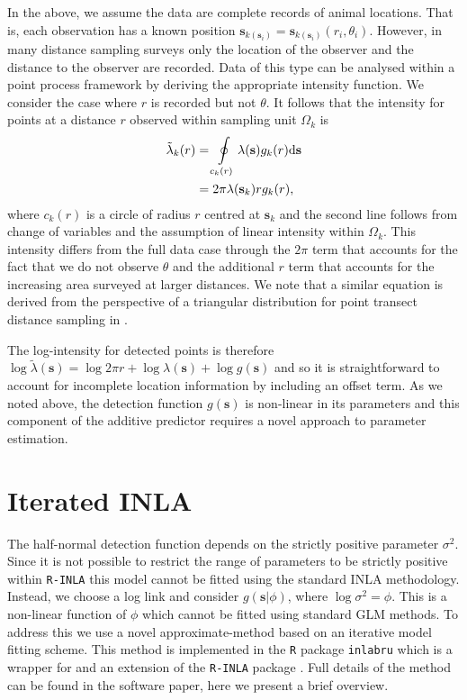 \documentclass{statsoc}
\newcommand{\bs}{\mathbf{s}}
\newcommand{\tl}{\tilde{\lambda}}   %
\begin{document}
In the above, we assume the data are complete records of animal locations.  That is, each observation has a known position $\bs_{k(\bs_i)} = \bs_{k(\bs_i)}(r_i, \theta_i)$.  However, in many distance sampling surveys only the location of the observer and the distance to the observer are recorded.  Data of this type can be analysed within a point process framework by deriving the appropriate intensity function.  We consider the case where $r$ is recorded but not $\theta$.  It follows that the intensity for points at a distance $r$ observed within sampling unit $\Omega_k$ is
\begin{align}
\label{intensity-incomplete}
\tl_k(r) &= \oint\displaylimits_{c_k(r)} \lambda(\bs)g_k(r)\mathrm{d}\bs \nonumber \\
&= 2\pi\lambda(\bs_k)rg_k(r),
\end{align}
where $c_k(r)$ is a circle of radius $r$ centred at $\bs_k$ and the second line follows from change of variables and the assumption of linear intensity within $\Omega_k$.  This intensity differs from the full data case through the $2\pi$  term that accounts for the fact that we do not observe $\theta$ and the additional $r$ term that accounts for the increasing area surveyed at larger distances.  We note that a similar equation is derived from the perspective of a triangular distribution for point transect distance sampling in \cite{buckland_advanced_2004}.  

The log-intensity for detected points is therefore $\log\tl(\bs) = \log 2 \pi r + \log\lambda(\bs) + \log g(\bs)$ and so it is straightforward to account for incomplete location information by including an offset term.  As we noted above, the detection function $g(\bs)$ is non-linear in its parameters and this component of the additive predictor requires a novel approach to parameter estimation.

\section{Iterated INLA}
\label{sec-iinla}

The half-normal detection function depends on the strictly positive parameter $\sigma^2$. Since it is not possible to restrict the range of parameters to be strictly positive within \texttt{R-INLA} this model cannot be fitted using the standard INLA methodology.  Instead, we choose a log link and consider $g(\bs | \phi)$, where $\log\sigma^2 = \phi$. This is a non-linear function of $\phi$ which cannot be fitted using standard GLM methods.  To address this we use a novel approximate-method based on an iterative model fitting scheme. This method is implemented in the \texttt{R} package \texttt{inlabru} which is a wrapper for and an extension of the \texttt{R-INLA} package \citep{lindgren_inlabru_2024}.  Full details of the method can be found in the software paper, here we present a brief overview.  
\end{document}
